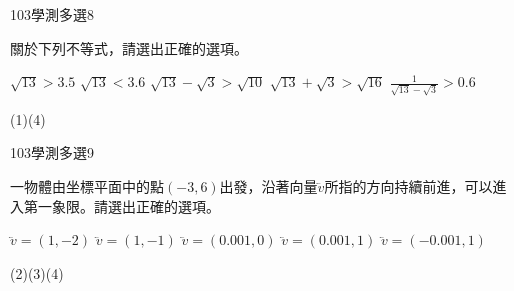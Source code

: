     \begin{QUESTION}
        \begin{ExamInfo}{103}{學測}{多選}{8}
        \end{ExamInfo}
        \begin{ExamAnsRateInfo}{73}{92}{82}{45}
        \end{ExamAnsRateInfo}
        \begin{QBODY}
            關於下列不等式，請選出正確的選項。
			\begin{QOPS}
				\QOP $\sqrt{13}>3.5$
				\QOP $\sqrt{13}<3.6$
				\QOP $\sqrt{13}-\sqrt{3}>\sqrt{10}$
				\QOP $\sqrt{13}+\sqrt{3}>\sqrt{16}$
				\QOP $\frac{1}{\sqrt{13}-\sqrt{3}}>0.6$
			\end{QOPS}
        \end{QBODY}
        \begin{QFROMS}
        \end{QFROMS}
        \begin{QTAGS}\end{QTAGS}
        \begin{QANS}
            (1)(4)
        \end{QANS}
        \begin{QSOLLIST}
        \end{QSOLLIST}
        \begin{QEMPTYSPACE}
        \end{QEMPTYSPACE}
    \end{QUESTION}
    \begin{QUESTION}
        \begin{ExamInfo}{103}{學測}{多選}{9}
        \end{ExamInfo}
        \begin{ExamAnsRateInfo}{71}{94}{77}{42}
        \end{ExamAnsRateInfo}
        \begin{QBODY}
            一物體由坐標平面中的點$(-3,6)$出發，沿著向量$\lvec{v}$所指的方向持續前進，可以進入第一象限。請選出正確的選項。
			\begin{QOPS}
				\QOP $\lvec{v}=(1,-2)$
				\QOP $\lvec{v}=(1,-1)$
				\QOP $\lvec{v}=(0.001,0)$
				\QOP $\lvec{v}=(0.001,1)$
				\QOP $\lvec{v}=(-0.001,1)$
			\end{QOPS}
        \end{QBODY}
        \begin{QFROMS}
        \end{QFROMS}
        \begin{QTAGS}\end{QTAGS}
        \begin{QANS}
            (2)(3)(4)
        \end{QANS}
        \begin{QSOLLIST}
        \end{QSOLLIST}
        \begin{QEMPTYSPACE}
        \end{QEMPTYSPACE}
    \end{QUESTION}
